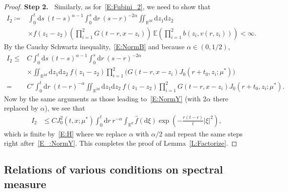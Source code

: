 \documentclass[sn-mathphys]{sn-jnl}%
\renewcommand{\R}{\mathbb{R}}
\newcommand{\E}{\mathbb{E}}
\newcommand{\ud}{\ensuremath{\mathrm{d}}}
\numberwithin{equation}{section}
\theoremstyle{thmstyleone}%
\theoremstyle{thmstyletwo}%
\theoremstyle{thmstylethree}%
\begin{document}
\begin{proof}
  \textbf{\noindent Step 2.~} Similarly, as for~\eqref{E:Fubini_2}, we need to show that
  \begin{align*}
    I_2\coloneqq & \int_0^t \ud s \: (t-s)^{\alpha-1} \int_0^s \ud r\: (s-r)^{-2\alpha} \iint_{\R^{2d}} \ud z_1\ud z_2\: \\
                 & \times f(z_1-z_2) \left(\prod_{i = 1}^{2} G(t-r,x-z_i)\right) \: \E\left(\prod_{i = 1}^{2}b(z_i,v(r,z_i))\right) < \infty.
  \end{align*}
  By the Cauchy Schwartz inequality,~\eqref{E:NormB} and because $\alpha\in (0,1/2)$,
  \begin{align*}
    I_2\le & C \int_0^t \ud s \: (t-s)^{\alpha-1} \int_0^s \ud r\: (s-r)^{-2\alpha}                                                        \\
           & \times \iint_{\R^{2d}} \ud z_1\ud z_2\:f(z_1-z_2) \prod_{i = 1}^{2}\bigg(G(t-r,x-z_i) J_0\left(r + t_0,z_i;\mu^*\right)\bigg) \\
         = & C' \int_0^t \ud r \: (t-r)^{-\alpha} \iint_{\R^{2d}} \ud z_1\ud z_2\:f(z_1-z_2) \prod_{i = 1}^{2}G(t-r,x-z_i) J_0\left(r + t_0, z_i;\mu^*\right).
  \end{align*}
  Now by the same arguments as those leading to~\eqref{E:NormY} (with $2\alpha$ there replaced by
  $\alpha$), we see that
  \begin{align*}
    I_2 & \le C J_0^2\left(t,x; \mu^*\right) \int_0^t \ud r \: r^{-\alpha} \int_{\R^d} \widehat{f}(\ud \xi)\exp\left(-\frac{r(t-r)}{t}\lvert\xi\rvert^2\right),
  \end{align*}
  which is finite by~\eqref{E:H} where we replace $\alpha$ with $\alpha/2$ and repeat the same steps
  right after~\eqref{E_:NormY}. This completes the proof of Lemma~\ref{L:Factorize}.
\end{proof}

%
%
%
%
%
%


\subsection{Relations of various conditions on spectral measure}
\end{document}
